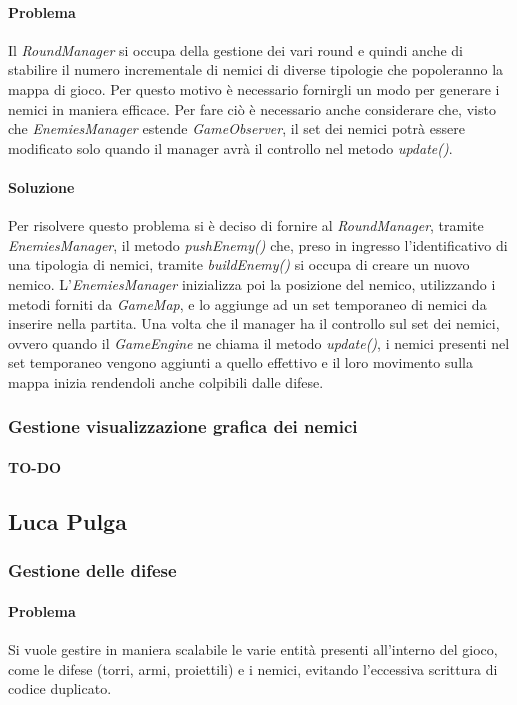 \documentclass[a4paper,12pt]{report}
\begin{document}
\paragraph{Problema} Il \textit{RoundManager} si occupa della gestione dei vari round e quindi anche di stabilire il numero incrementale di nemici di diverse tipologie che popoleranno la mappa di gioco. Per questo motivo è necessario fornirgli un modo per generare i nemici in maniera efficace. Per fare ciò è necessario anche considerare che, visto che \textit{EnemiesManager} estende \textit{GameObserver}, il set dei nemici potrà essere modificato solo quando il manager avrà il controllo nel metodo \textit{update()}.

\paragraph{Soluzione} Per risolvere questo problema si è deciso di fornire al \textit{RoundManager}, tramite \textit{EnemiesManager}, il metodo \textit{pushEnemy()} che, preso in ingresso l'identificativo di una tipologia di nemici, tramite \textit{buildEnemy()} si occupa di creare un nuovo nemico. L'\textit{EnemiesManager} inizializza poi la posizione del nemico, utilizzando i metodi forniti da \textit{GameMap}, e lo aggiunge ad un set temporaneo di nemici da inserire nella partita. Una volta che il manager ha il controllo sul set dei nemici, ovvero quando il \textit{GameEngine} ne chiama il metodo \textit{update()}, i nemici presenti nel set temporaneo vengono aggiunti a quello effettivo e il loro movimento sulla mappa inizia rendendoli anche colpibili dalle difese.

\subsubsection{Gestione visualizzazione grafica dei nemici}
\paragraph{TO-DO}


\newpage
\subsection{Luca Pulga}
\subsubsection{Gestione delle difese}
\paragraph{Problema}
Si vuole gestire in maniera scalabile le varie entità presenti all'interno del gioco, come le difese (torri, armi, proiettili) e i nemici, evitando l'eccessiva scrittura di codice duplicato.
\end{document}
